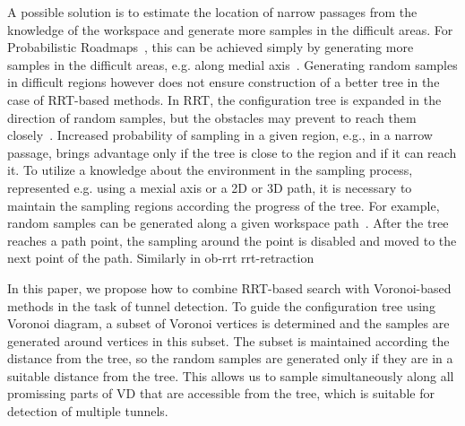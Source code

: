 \documentclass{llncs}
\begin{document}
A possible solution is to estimate the location of narrow passages from the knowledge of the workspace and generate more samples
in the difficult areas.
For Probabilistic Roadmaps~\cite{kavrakiPRM}, this can be achieved simply by generating more samples in the difficult areas, e.g. along
medial axis~\cite{wilmarthMAPRM,foskey01hybrid,guibas1999probabilistic,hoff2000interactive,yang2004adapting}.
Generating random samples in difficult regions however does not ensure construction of a better tree in the case of RRT-based methods. 
In RRT, the configuration tree is expanded in the direction of random samples, but the obstacles may prevent to reach them closely~\cite{vonasekphd}.
Increased probability of sampling in a given region, e.g., in a narrow passage, 
brings advantage only if the tree is close to the region and if it can reach it.
To utilize a knowledge about the environment in the sampling process, represented e.g. using a mexial axis or a 2D or 3D path,
it is necessary to maintain the sampling regions according the progress of the tree.
For example, random samples can be generated along a given workspace path~\cite{vonasek2009rrt}.
After the tree reaches a path point, the sampling around the point is disabled and moved to the next point of 
the path.
Similarly in
\cite{jorry14marrt,neddy2016dynnamic}
ob-rrt
rrt-retraction


In this paper, we propose how to combine RRT-based search with Voronoi-based methods in the task of tunnel detection. 
To guide the configuration tree using Voronoi diagram, a subset of Voronoi vertices is determined and
the samples are generated around vertices in this subset.
The subset is maintained according the distance from the tree, so the random samples
are generated only if they are in a suitable distance from the tree.
This allows us to sample simultaneously along all promissing parts of VD that are accessible from the tree, which is 
suitable for detection of multiple tunnels.


\end{document}
